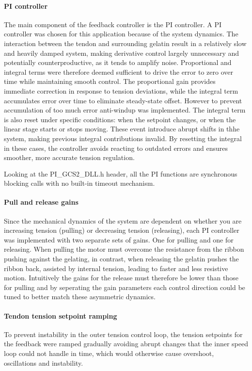 \paragraph*{PI controller}
The main component of the feedback controller is the PI controller. A PI controller was chosen for this application because of the system dynamics. The interaction between the tendon and surrounding gelatin result in a relatively slow and heavily damped system, making derivative control largely unnecessary and potentially counterproductive, as it tends to amplify noise. Proportional and integral terms were therefore deemed sufficient to drive the error to zero over time while maintaining smooth control. 
\newline \newline
The proportional gain provides immediate correction in response to tension deviations, while the integral term accumulates error over time to eliminate steady-state offset. However to prevent accumulation of too much error anti-windup was implemented. The integral term is also reset under specific conditions: when the setpoint changes, or when the linear stage starts or stops moving. These event introduce abrupt shifts in thhe system, making previous integral contributions invalid. By resetting the integral in these cases, the controller avoids reacting to outdated errors and ensures smoother, more accurate tension regulation. 

Looking at the PI_GCS2_DLL.h header, all the PI functions are synchronous blocking calls with no built-in timeout mechanism.

\paragraph*{Pull and release gains}
Since the mechanical dynamics of the system are dependent on whether you are increasing tension (pulling) or decreasing tension (releasing), each PI controller was implemented with two separate sets of gains. One for pulling and one for releasing. When pulling the motor must overcome the resistance from the ribbon pushing against the gelating, in contrast, when releasing the gelatin pushes the ribbon back, assisted by internal tension, leading to faster and less resistive motion. Intuitively the gains for the release must therefore be lower than those for pulling and by seperating the gain parameters each control direction could be tuned to better match these asymmetric dynamics.

\paragraph*{Tendon tension setpoint ramping}
To prevent instability in the outer tension control loop, the tension setpoints for the feedback were ramped gradually avoiding abrupt changes that the inner speed loop could not handle in time, which would otherwise cause overshoot, oscillations and instability.

